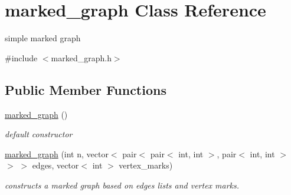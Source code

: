 \hypertarget{classmarked__graph}{}\section{marked\+\_\+graph Class Reference}
\label{classmarked__graph}


simple marked graph  




{\ttfamily \#include $<$marked\+\_\+graph.\+h$>$}

\subsection*{Public Member Functions}
\begin{DoxyCompactItemize}
\item 
\hyperlink{classmarked__graph_acff011a677859b66513c42c4f7e8d531}{marked\+\_\+graph} ()
\begin{DoxyCompactList}\small\item\em default constructor \end{DoxyCompactList}\item 
\hyperlink{classmarked__graph_a83ae66845b006cfeeed677bdc2d584db}{marked\+\_\+graph} (int n, vector$<$ pair$<$ pair$<$ int, int $>$, pair$<$ int, int $>$ $>$ $>$ edges, vector$<$ int $>$ vertex\+\_\+marks)
\begin{DoxyCompactList}\small\item\em constructs a marked graph based on edges lists and vertex marks. \end{DoxyCompactList}\end{DoxyCompactItemize}
